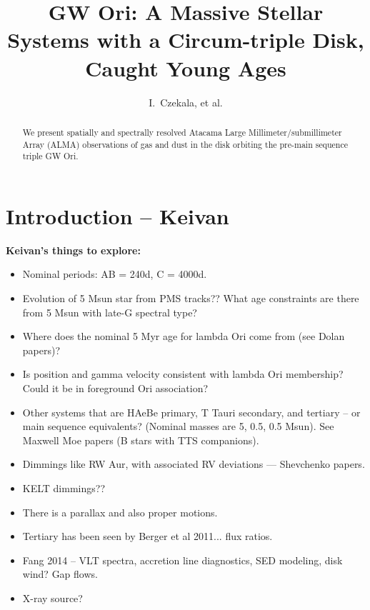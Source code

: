 \documentclass{aastex6}
\begin{document}
\title{GW Ori: A Massive Stellar Systems with a Circum-triple Disk, Caught Young Ages}
\author{I.~Czekala, et al. }%

\begin{abstract}
We present spatially and spectrally resolved Atacama Large Millimeter/submillimeter Array (ALMA) observations of gas and dust in the disk orbiting the pre-main sequence triple GW Ori.
\end{abstract}


\section{Introduction -- {\bf Keivan} \label{sec:intro}}

\noindent
{\bf Keivan's things to explore:}
\begin{itemize}
\item Nominal periods: AB = 240d, C = 4000d.
\item Evolution of 5 Msun star from PMS tracks?? What age constraints are there from 5 Msun with late-G spectral type?
\item Where does the nominal 5 Myr age for lambda Ori come from (see Dolan papers)?
\item Is position and gamma velocity consistent with lambda Ori membership? Could it be in foreground Ori association?
\item Other systems that are HAeBe primary, T Tauri secondary, and tertiary -- or main sequence equivalents? (Nominal masses are 5, 0.5, 0.5 Msun). See Maxwell Moe papers (B stars with TTS companions).
\item Dimmings like RW Aur, with associated RV deviations --- Shevchenko papers.
\item KELT dimmings??
\item There is a parallax and also proper motions.
\item Tertiary has been seen by Berger et al 2011... flux ratios.
\item Fang 2014 -- VLT spectra, accretion line diagnostics, SED modeling, disk wind? Gap flows.
\item X-ray source?
\end{itemize}
\end{document}
